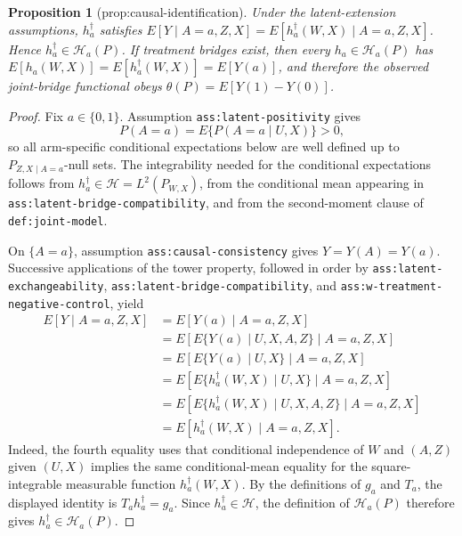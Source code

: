 \documentclass{article}
\newtheorem{proposition}{Proposition}
\begin{document}
\begin{proposition}[prop:causal-identification]\label{prop:causal-identification}
Under the latent-extension assumptions, \(h_a^\dagger\) satisfies \(E[Y\mid A=a,Z,X]=E[h_a^\dagger(W,X)\mid A=a,Z,X]\). Hence \(h_a^\dagger\in\mathcal H_a(P)\). If treatment bridges exist, then every \(h_a\in\mathcal H_a(P)\) has \(E[h_a(W,X)]=E[h_a^\dagger(W,X)]=E[Y(a)]\), and therefore the observed joint-bridge functional obeys \(\theta(P)=E[Y(1)-Y(0)]\).
\end{proposition}
\begin{proof}
Fix \(a\in\{0,1\}\).  Assumption \texttt{ass:latent-positivity} gives
\[
P(A=a)=E\{P(A=a\mid U,X)\}>0,
\]
so all arm-specific conditional expectations below are well defined up to
\(P_{Z,X\mid A=a}\)-null sets.  The integrability needed for the conditional
expectations follows from \(h_a^\dagger\in\mathcal H=L^2(P_{W,X})\), from the
conditional mean appearing in \texttt{ass:latent-bridge-compatibility}, and
from the second-moment clause of \texttt{def:joint-model}.

On \(\{A=a\}\), assumption \texttt{ass:causal-consistency} gives
\(Y=Y(A)=Y(a)\).  Successive applications of the tower property, followed in
order by \texttt{ass:latent-exchangeability},
\texttt{ass:latent-bridge-compatibility}, and
\texttt{ass:w-treatment-negative-control}, yield
\[
\begin{aligned}
E[Y\mid A=a,Z,X]
&=E[Y(a)\mid A=a,Z,X]\\
&=E\!\left[E\{Y(a)\mid U,X,A,Z\}\mid A=a,Z,X\right]\\
&=E\!\left[E\{Y(a)\mid U,X\}\mid A=a,Z,X\right]\\
&=E\!\left[E\{h_a^\dagger(W,X)\mid U,X\}\mid A=a,Z,X\right]\\
&=E\!\left[E\{h_a^\dagger(W,X)\mid U,X,A,Z\}\mid A=a,Z,X\right]\\
&=E[h_a^\dagger(W,X)\mid A=a,Z,X].
\end{aligned}
\]
Indeed, the fourth equality uses that conditional independence of \(W\) and
\((A,Z)\) given \((U,X)\) implies the same conditional-mean equality for the
square-integrable measurable function \(h_a^\dagger(W,X)\).  By the
definitions of \(g_a\) and \(T_a\), the displayed identity is
\(T_a h_a^\dagger=g_a\).  Since \(h_a^\dagger\in\mathcal H\), the definition
of \(\mathcal H_a(P)\) therefore gives
\(h_a^\dagger\in\mathcal H_a(P)\).


\end{proof}
\end{document}
